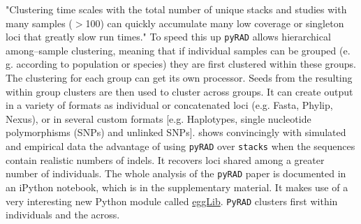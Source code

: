 \documentclass{article}\usepackage[]{graphicx}\usepackage[]{color}
\begin{document}
"Clustering time scales with the total number of unique stacks and studies with many samples ($>$100) can quickly accumulate many low coverage or singleton loci that greatly slow run times." To speed this up \texttt{pyRAD} allows hierarchical among--sample clustering, meaning that if individual samples can be grouped (e. g. according to population or species) they are first clustered within these groups. The clustering for each group can get its own processor. Seeds from the resulting within group clusters are then used to cluster across groups. 
It can create output in a variety of formats as individual or concatenated loci (e.g. Fasta, Phylip, Nexus), or in several custom formats [e.g. Haplotypes, single nucleotide polymorphisms (SNPs) and unlinked SNPs]. \cite{Eaton2014} shows convincingly with simulated and empirical data the advantage of using \texttt{pyRAD} over \texttt{stacks} when the sequences contain realistic numbers of \glspl{indel}. It recovers loci shared among a greater number of individuals.
The whole analysis of the \texttt{pyRAD} paper is documented in an iPython notebook, which is in the supplementary material. It makes use of a very interesting new Python module called \href{http://egglib.sourceforge.net/manual.html#manual}{eggLib}. \texttt{PyRAD} clusters first within individuals and the across.
\end{document}

